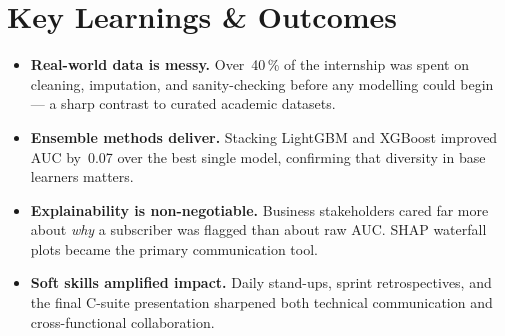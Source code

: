 \section{Key Learnings \& Outcomes}

\begin{itemize}[leftmargin=18pt,itemsep=4pt,topsep=4pt]
    \item \textbf{Real-world data is messy.} Over~40\,\% of the internship was
          spent on cleaning, imputation, and sanity-checking before any modelling
          could begin --- a sharp contrast to curated academic datasets.
    \item \textbf{Ensemble methods deliver.} Stacking LightGBM and XGBoost
          improved AUC by~0.07 over the best single model, confirming that
          diversity in base learners matters.
    \item \textbf{Explainability is non-negotiable.} Business stakeholders cared
          far more about \emph{why} a subscriber was flagged than about raw AUC.
          SHAP waterfall plots became the primary communication tool.
    \item \textbf{Soft skills amplified impact.} Daily stand-ups, sprint
          retrospectives, and the final C-suite presentation sharpened both
          technical communication and cross-functional collaboration.
\end{itemize}

